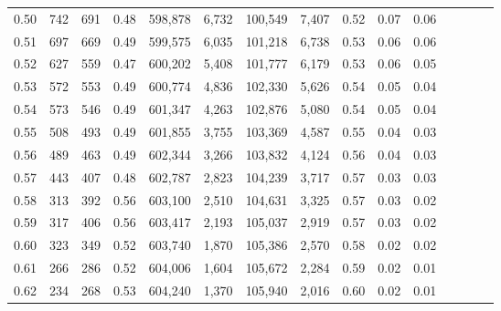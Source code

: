 \begin{tabular}{rrrcrrrrrrrrrrr}
0.50 &     742 &    691 &                                       0.48 &  598,878 &    6,732 &  100,549 &    7,407 &  0.52 &  0.07 &                         0.06 \\
0.51 &     697 &    669 &                                       0.49 &  599,575 &    6,035 &  101,218 &    6,738 &  0.53 &  0.06 &                         0.06 \\
0.52 &     627 &    559 &                                       0.47 &  600,202 &    5,408 &  101,777 &    6,179 &  0.53 &  0.06 &                         0.05 \\
0.53 &     572 &    553 &                                       0.49 &  600,774 &    4,836 &  102,330 &    5,626 &  0.54 &  0.05 &                         0.04 \\
0.54 &     573 &    546 &                                       0.49 &  601,347 &    4,263 &  102,876 &    5,080 &  0.54 &  0.05 &                         0.04 \\
0.55 &     508 &    493 &                                       0.49 &  601,855 &    3,755 &  103,369 &    4,587 &  0.55 &  0.04 &                         0.03 \\
0.56 &     489 &    463 &                                       0.49 &  602,344 &    3,266 &  103,832 &    4,124 &  0.56 &  0.04 &                         0.03 \\
0.57 &     443 &    407 &                                       0.48 &  602,787 &    2,823 &  104,239 &    3,717 &  0.57 &  0.03 &                         0.03 \\
0.58 &     313 &    392 &                                       0.56 &  603,100 &    2,510 &  104,631 &    3,325 &  0.57 &  0.03 &                         0.02 \\
0.59 &     317 &    406 &                                       0.56 &  603,417 &    2,193 &  105,037 &    2,919 &  0.57 &  0.03 &                         0.02 \\
0.60 &     323 &    349 &                                       0.52 &  603,740 &    1,870 &  105,386 &    2,570 &  0.58 &  0.02 &                         0.02 \\
0.61 &     266 &    286 &                                       0.52 &  604,006 &    1,604 &  105,672 &    2,284 &  0.59 &  0.02 &                         0.01 \\
0.62 &     234 &    268 &                                       0.53 &  604,240 &    1,370 &  105,940 &    2,016 &  0.60 &  0.02 &                         0.01 \\

\end{tabular}
